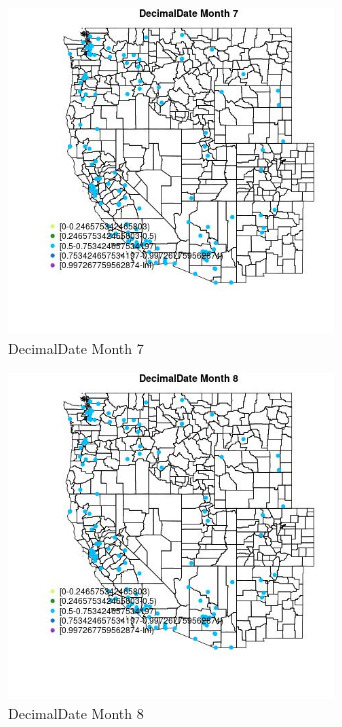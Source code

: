 \begin{figure} 
\centering  
\includegraphics[width=0.77\textwidth]{Code_Outputs/Report_ML_input_PM25_Step4_part_e_de_duplicated_aves_MapObsMo7DecimalDate.jpg} 
\caption{\label{fig:Report_ML_input_PM25_Step4_part_e_de_duplicated_avesMapObsMo7DecimalDate}DecimalDate Month 7} 
\end{figure} 
 

\begin{figure} 
\centering  
\includegraphics[width=0.77\textwidth]{Code_Outputs/Report_ML_input_PM25_Step4_part_e_de_duplicated_aves_MapObsMo8DecimalDate.jpg} 
\caption{\label{fig:Report_ML_input_PM25_Step4_part_e_de_duplicated_avesMapObsMo8DecimalDate}DecimalDate Month 8} 
\end{figure} 
 

